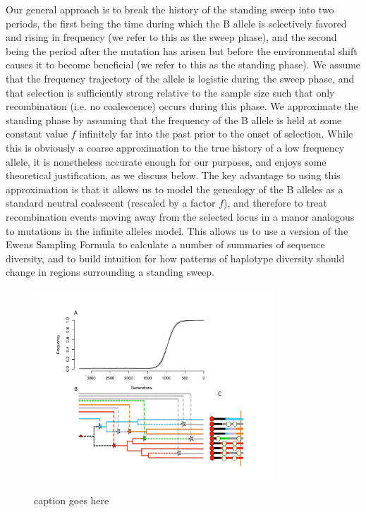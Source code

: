 \documentclass[a4paper,10pt]{article}
\newcommand{\jb}[1]{{\it\color{blue} (#1)} }
\begin{document}
Our general approach is to break the history of the standing sweep into two periods, the first being the time during which the B allele is selectively favored and rising in frequency (we refer to this as the sweep phase), and the second being the period after the mutation has arisen but before the environmental shift causes it to become beneficial (we refer to this as the standing phase). We assume that the frequency trajectory of the allele is logistic during the sweep phase, and that selection is sufficiently strong relative to the sample size such that only recombination (i.e. no coalescence) occurs during this phase. We approximate the standing phase by assuming that the frequency of the B allele is held at some constant value $f$ infinitely far into the past prior to the onset of selection. While this is obviously a coarse approximation to the true history of a low frequency allele, it is nonetheless accurate enough for our purposes, and enjoys some theoretical justification, as we discuss below. The key advantage to using this approximation is that it allows us to model the genealogy of the B alleles as a standard neutral coalescent (rescaled by a factor $f$), and therefore to treat recombination events moving away from the selected locus in a manor analogous to mutations in the infinite alleles model. This allows us to use a version of the Ewens Sampling Formula to calculate a number of summaries of sequence diversity, and to build intuition for how patterns of haplotype diversity should change in regions surrounding a standing sweep.


\begin{figure}
	\includegraphics[width = 0.8\textwidth]{../Paper_Figures/SchematicFig1.pdf} \label{cartoon_fig_2}
	\caption{caption goes here}
\end{figure}
\end{document}
